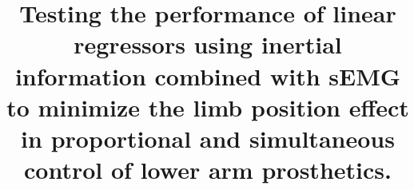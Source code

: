 



\pagebreak             %




\setlength\cftaftertoctitleskip{2pt}
\setlength\cftafterloftitleskip{6pt}
\setlength\cftafterlottitleskip{6pt}
\title{Testing the performance of linear regressors using inertial information combined with sEMG to minimize the limb position effect in proportional and simultaneous control of lower arm prosthetics.}

\pagestyle{empty} %
\fancyfoot[LE,RO]{\thepage}
\fancyhead[LE,LO,RE,RO]{}

%
\pagestyle{fancy}
%
\clearpage

\tableofcontents
\cleardoublepage


